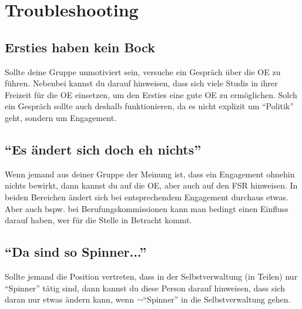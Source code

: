 \documentclass[a4paper,11pt]{scrartcl} %
\begin{document}
\section{Troubleshooting}

\subsection{Ersties haben kein Bock}

Sollte deine Gruppe unmotiviert sein, versuche ein Gespräch über die OE zu führen. Nebenbei kannst
du darauf hinweisen, dass sich viele Studis in ihrer Freizeit für die OE einsetzen, um den Ersties
eine gute OE zu ermöglichen. Solch ein Gespräch sollte auch deshalb funktionieren, da es nicht explizit
um "`Politik"' geht, sondern um Engagement.

\subsection{"`Es ändert sich doch eh nichts"'}

Wenn jemand aus deiner Gruppe der Meinung ist, dass ein Engagement ohnehin nichts bewirkt, dann kannst
du auf die OE, aber auch auf den FSR hinweisen. In beiden Bereichen ändert sich bei entsprechendem
Engagement durchaus etwas. Aber auch bspw. bei Berufungskommissionen kann man bedingt einen Einfluss darauf
haben, wer für die Stelle in Betracht kommt.

\subsection{"`Da sind so Spinner..."'}

Sollte jemand die Position vertreten, dass in der Selbstverwaltung (in Teilen) nur "`Spinner"' tätig sind,
dann kannst du diese Person darauf hinweisen, dass sich daran nur etwas ändern kann, wenn ¬"`Spinner"'
in die Selbstverwaltung gehen.
\end{document}
